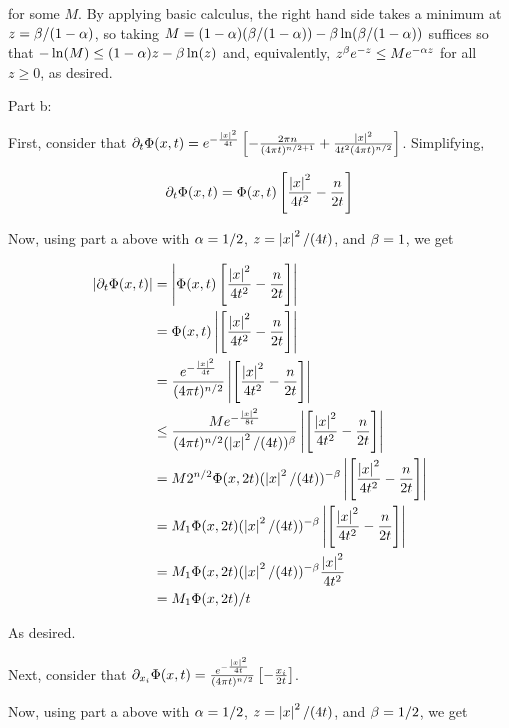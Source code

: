 \documentclass[a4paper,12pt]{article}
\begin{document}
for some $M$. By applying basic calculus, the right hand side takes a minimum at $z = \beta / (1-\alpha)$, so taking $M = (1-\alpha)(\beta / (1-\alpha)) - \beta \ln(\beta / (1-\alpha))$ suffices so that $-\ln(M) \leq (1-\alpha)z - \beta \ln(z)$ and, equivalently, $z^\beta e^{-z} \leq Me^{-\alpha z}$ for all $z \geq 0$, as desired.

\shunt

Part b:

First, consider that $\partial_t \Phi(x,t) = e^{-\frac{\left\lvert x \right\rvert^2}{4t}} \left[-\frac{2\pi n}{(4\pi t)^{n/2+1}} + \frac{\left\lvert x \right\rvert^2}{4t^2(4 \pi t)^{n/2}}\right]$. Simplifying,

\begin{align*}
\partial_t \Phi(x,t) &= \Phi(x,t) \left[ \frac{\left\lvert x \right\rvert^2}{4t^2} - \frac{n}{2t}\right]\\
\end{align*}

Now, using part a above with $\alpha = 1/2$, $z = \left\lvert x \right\rvert^2/(4t)$, and $\beta = 1$, we get

\begin{align*}
\left\lvert \partial_t \Phi(x,t) \right\rvert &= \left\lvert \Phi(x,t) \left[ \frac{\left\lvert x \right\rvert^2}{4t^2} - \frac{n}{2t}\right] \right\rvert\\
&= \Phi(x,t)\left\lvert \left[ \frac{\left\lvert x \right\rvert^2}{4t^2} - \frac{n}{2t}\right] \right\rvert\\
&= \frac{e^{-\frac{\left\lvert x \right\rvert^2}{4t}}}{(4 \pi t)^{n/2}}\left\lvert \left[ \frac{\left\lvert x \right\rvert^2}{4t^2} - \frac{n}{2t}\right] \right\rvert\\
&\leq \frac{Me^{-\frac{\left\lvert x \right\rvert^2}{8t}}}{(4 \pi t)^{n/2} (\left\lvert x \right\rvert^2/(4t))^\beta}\left\lvert \left[ \frac{\left\lvert x \right\rvert^2}{4t^2} - \frac{n}{2t}\right] \right\rvert\\
&= M2^{n/2} \Phi(x,2t) (\left\lvert x \right\rvert^2/(4t))^{-\beta}\left\lvert \left[ \frac{\left\lvert x \right\rvert^2}{4t^2} - \frac{n}{2t}\right] \right\rvert\\
&= M_1 \Phi(x,2t) (\left\lvert x \right\rvert^2/(4t))^{-\beta}\left\lvert \left[ \frac{\left\lvert x \right\rvert^2}{4t^2} - \frac{n}{2t}\right] \right\rvert\\
&= M_1 \Phi(x,2t) (\left\lvert x \right\rvert^2/(4t))^{-\beta}\frac{\left\lvert x \right\rvert^2}{4t^2}\\
&= M_1 \Phi(x,2t)/t\\
\end{align*}

As desired.

Next, consider that $\partial_{x_i} \Phi(x,t) = \frac{e^{-\frac{\left\lvert x \right\rvert^2}{4t}}}{(4 \pi t)^{n/2}}\left[-\frac{x_i}{2t}\right]$.

Now, using part a above with $\alpha = 1/2$, $z = \left\lvert x \right\rvert^2/(4t)$, and $\beta = 1/2$, we get
\end{document}
